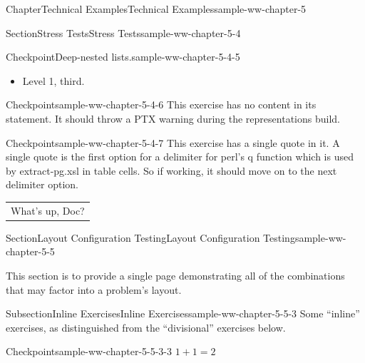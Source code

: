 \documentclass[oneside,10pt,]{book}
\newcommand{\tabularfont}{\relax}
\numberwithin{equation}{section}
\begin{document}
\begin{chapterptx}{Chapter}{Technical Examples}{}{Technical Examples}{}{}{sample-ww-chapter-5}
\begin{sectionptx}{Section}{Stress Tests}{}{Stress Tests}{}{}{sample-ww-chapter-5-4}
\begin{inlineexercise}{Checkpoint}{Deep-nested lists.}{sample-ww-chapter-5-4-5}
\begin{itemize}[label=\textbullet]
\begin{itemize}[label=$\circ$]
\begin{itemize}[label=$\blacksquare$]
\begin{itemize}[label=\textbullet]
\end{itemize}
%
\item{}Level 3, third.%
\end{itemize}
%
\item{}Level 2, third.%
\end{itemize}
%
\item{}Level 1, third.%
\end{itemize}
%
\end{inlineexercise}%
\begin{inlineexercise}{Checkpoint}{}{sample-ww-chapter-5-4-6}%
This exercise has no content in its statement. It should throw a PTX warning during the representations build.%
\end{inlineexercise}%
\begin{inlineexercise}{Checkpoint}{}{sample-ww-chapter-5-4-7}%
This exercise has a single quote in it. A single quote is the first option for a delimiter for perl's q function which is used by extract-pg.xsl in table cells. So if working, it should move on to the next delimiter option.%
\begin{center}%
{\tabularfont%
\begin{tabular}{l}
What's up, Doc?
\end{tabular}
}%
\end{center}%
\end{inlineexercise}%
\end{sectionptx}
%
%
\typeout{************************************************}
\typeout{************************************************}
%
\begin{sectionptx}{Section}{Layout Configuration Testing}{}{Layout Configuration Testing}{}{}{sample-ww-chapter-5-5}
\begin{introduction}{}%
This section is to provide a single page demonstrating all of the combinations that may factor into a problem's layout.%
\end{introduction}%
%
%
\typeout{************************************************}
\typeout{************************************************}
%
\begin{subsectionptx}{Subsection}{Inline Exercises}{}{Inline Exercises}{}{}{sample-ww-chapter-5-5-3}
Some ``inline'' exercises, as distinguished from the ``divisional'' exercises below.%
\begin{inlineexercise}{Checkpoint}{}{sample-ww-chapter-5-5-3-3}%
\(1+1=2\)%
\end{inlineexercise}%

\end{subsectionptx}
\end{sectionptx}
\end{chapterptx}
\end{document}
